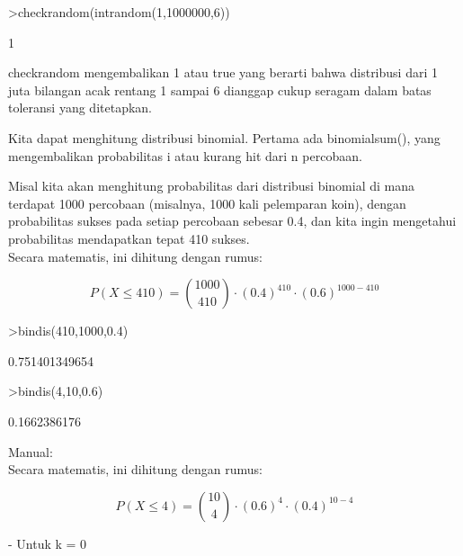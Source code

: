 \documentclass{article}
\begin{document}
\begin{eulernotebook}
\begin{eulercomment}
\begin{eulercomment}
\begin{eulercomment}
\end{eulercomment}
\begin{eulerprompt}
>checkrandom(intrandom(1,1000000,6))
\end{eulerprompt}
\begin{euleroutput}
  1
\end{euleroutput}
\begin{eulercomment}
checkrandom mengembalikan 1 atau true yang berarti bahwa distribusi
dari 1 juta bilangan acak rentang 1 sampai 6 dianggap cukup seragam
dalam batas toleransi yang ditetapkan.

Kita dapat menghitung distribusi binomial. Pertama ada binomialsum(),
yang mengembalikan probabilitas i atau kurang hit dari n percobaan.

Misal kita akan menghitung probabilitas dari distribusi binomial di
mana terdapat 1000 percobaan (misalnya, 1000 kali pelemparan koin),
dengan probabilitas sukses pada setiap percobaan sebesar 0.4, dan kita
ingin mengetahui probabilitas mendapatkan tepat 410 sukses.\\
Secara matematis, ini dihitung dengan rumus:\\
\end{eulercomment}
\begin{eulerformula}
\[
P(X \leq 410)= \binom{1000}{410} \cdot (0.4)^{410} \cdot (0.6)^{1000-410}
\]
\end{eulerformula}
\begin{eulerprompt}
>bindis(410,1000,0.4)
\end{eulerprompt}
\begin{euleroutput}
  0.751401349654
\end{euleroutput}
\begin{eulerprompt}
>bindis(4,10,0.6)
\end{eulerprompt}
\begin{euleroutput}
  0.1662386176
\end{euleroutput}
\begin{eulercomment}
Manual:\\
Secara matematis, ini dihitung dengan rumus:\\
\end{eulercomment}
\begin{eulerformula}
\[
P(X \leq 4)= \binom{10}{4} \cdot (0.6)^{4} \cdot (0.4)^{10-4}
\]
\end{eulerformula}
\begin{eulercomment}
- Untuk k = 0\\
\end{eulercomment}

\end{eulercomment}
\end{eulercomment}
\end{eulernotebook}
\end{document}
